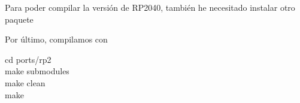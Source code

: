 \vspace{-1cm} 
Para poder compilar la versión de RP2040, también he necesitado instalar otro paquete \mybreak {} \par

Por último, compilamos con 
\begin{multicli}
  \cliarrow cd ports/rp2 \\
  \cliarrow make submodules \\
  \cliarrow make clean \\
  \cliarrow make
\end{multicli}
